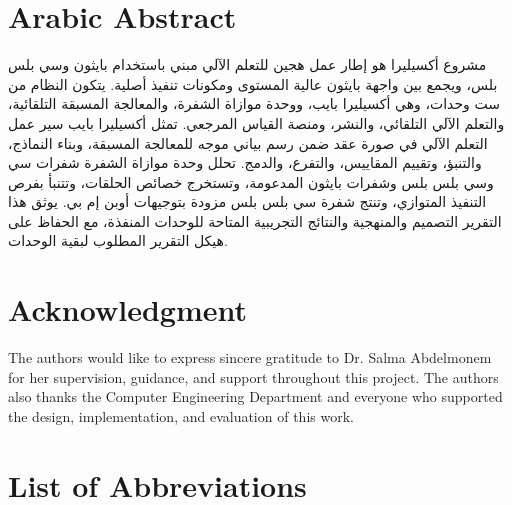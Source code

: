 \documentclass[12pt,a4paper]{report}
\begin{document}
\clearpage
\chapter*{Arabic Abstract}
\begin{otherlanguage}{arabic}
مشروع أكسيليرا هو إطار عمل هجين للتعلم الآلي مبني باستخدام بايثون وسي بلس
بلس، ويجمع بين واجهة بايثون عالية المستوى ومكونات تنفيذ أصلية. يتكون النظام
من ست وحدات، وهي أكسيليرا بايب، ووحدة موازاة الشفرة، والمعالجة المسبقة
التلقائية، والتعلم الآلي التلقائي، والنشر، ومنصة القياس المرجعي. تمثل أكسيليرا
بايب سير عمل التعلم الآلي في صورة عقد ضمن رسم بياني موجه للمعالجة المسبقة،
وبناء النماذج، والتنبؤ، وتقييم المقاييس، والتفرع، والدمج. تحلل وحدة موازاة
الشفرة شفرات سي وسي بلس بلس وشفرات بايثون المدعومة، وتستخرج خصائص الحلقات،
وتتنبأ بفرص التنفيذ المتوازي، وتنتج شفرة سي بلس بلس مزودة بتوجيهات أوبن إم
بي. يوثق هذا التقرير التصميم والمنهجية والنتائج التجريبية المتاحة للوحدات
المنفذة، مع الحفاظ على هيكل التقرير المطلوب لبقية الوحدات.
\end{otherlanguage}

\clearpage
\chapter*{Acknowledgment}
The authors would like to express sincere gratitude to Dr. Salma Abdelmonem for her
supervision, guidance, and support throughout this project. The authors also thanks
the Computer Engineering Department and everyone who supported the design,
implementation, and evaluation of this work.

\clearpage
\tableofcontents
\clearpage
\listoffigures
\clearpage
\listoftables
\clearpage
\lstlistoflistings
\clearpage

\chapter*{List of Abbreviations}
\end{document}
